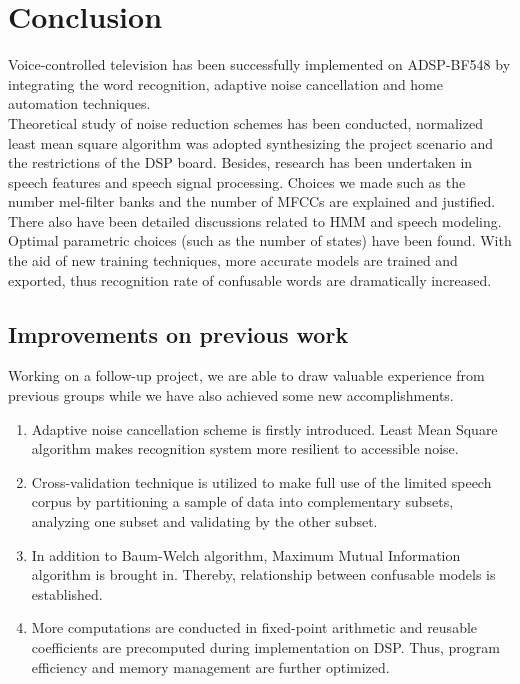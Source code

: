 \chapter{Conclusion}
\label{chapter:conclusion}

Voice-controlled television has been successfully implemented on ADSP-BF548 by integrating the word recognition, adaptive noise cancellation and home automation techniques.\\

Theoretical study of noise reduction schemes has been conducted, normalized least mean square algorithm was adopted synthesizing the project scenario and the restrictions of the DSP board. Besides, research has been undertaken in speech features and speech signal processing. Choices we made such as the number mel-filter banks and the number of MFCCs are explained and justified. There also have been detailed discussions related to HMM and speech modeling. Optimal parametric choices (such as the number of states) have been found. With the aid of new training techniques, more accurate models are trained and exported, thus recognition rate of confusable words are dramatically increased.


\section{Improvements on previous work}

Working on a follow-up project, we are able to draw valuable experience from previous groups while we have also achieved some new accomplishments.

\begin{enumerate}
\item Adaptive noise cancellation scheme is firstly introduced. Least Mean Square algorithm makes recognition system more resilient to accessible noise.
\item Cross-validation technique is utilized to make full use of the limited speech corpus by partitioning a sample of data into complementary subsets, analyzing one subset and validating by the other subset.
\item In addition to Baum-Welch algorithm, Maximum Mutual Information algorithm is brought in. Thereby, relationship between confusable models is established.
\item More computations are conducted in fixed-point arithmetic and reusable coefficients are precomputed during implementation on DSP. Thus, program efficiency and memory management are further optimized.
\end{enumerate}

